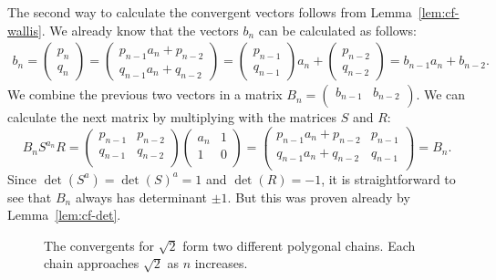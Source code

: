 The second way to calculate the convergent vectors follows from Lemma~\ref{lem:cf-wallis}.
We already know that the vectors $b_n$ can be calculated as follows:
\begin{align*}
  b_n =
  \begin{pmatrix}
    p_n \\ q_n
  \end{pmatrix}
  =
  \begin{pmatrix}
    p_{n-1} a_n + p_{n-2} \\ q_{n-1} a_n + q_{n-2}
  \end{pmatrix}
  =
  \begin{pmatrix}
    p_{n-1} \\ q_{n-1}
  \end{pmatrix}
  a_n
  +
  \begin{pmatrix}
    p_{n-2} \\ q_{n-2}
  \end{pmatrix}
  = b_{n-1} a_n + b_{n-2}.
\end{align*}
We combine the previous two vectors in a matrix $B_n = \begin{pmatrix}
  b_{n-1} & b_{n-2} \\
\end{pmatrix}$.
We can calculate the next matrix by multiplying with the matrices $S$ and $R$:
\[
  B_n S^{a_n} R =
  \begin{pmatrix}
    p_{n-1} & p_{n-2} \\
    q_{n-1} & q_{n-2} \\
  \end{pmatrix}
  \begin{pmatrix}
    a_n & 1 \\
    1   & 0 \\
  \end{pmatrix}
  =
  \begin{pmatrix}
    p_{n-1} a_n + p_{n-2} & p_{n-1} \\
    q_{n-1} a_n + q_{n-2} & q_{n-1} \\
  \end{pmatrix}
  =
  B_n.
\]
Since $\det(S^a) = \det(S)^a = 1$ and $\det(R) = -1$, it is straightforward to
see that $B_n$ always has determinant $±1$.
But this was proven already by Lemma~\ref{lem:cf-det}.

\begin{figure}[tb]
  \centering
  
  \caption{
    The convergents for $\sqrt{2}$ form two different polygonal chains.
    Each chain approaches $\sqrt{2}$ as $n$ increases.
  }
  \label{fig:klein-polygon}
\end{figure}

